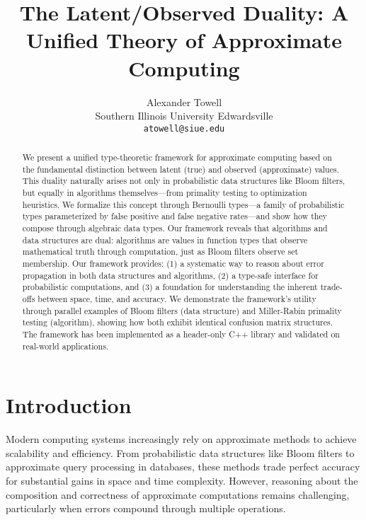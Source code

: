 \documentclass[11pt]{article}
\title{The Latent/Observed Duality: A Unified Theory of Approximate Computing}
\author{Alexander Towell\\
Southern Illinois University Edwardsville\\
\texttt{atowell@siue.edu}}
\begin{document}
\maketitle

\begin{abstract}
We present a unified type-theoretic framework for approximate computing based on the fundamental distinction between latent (true) and observed (approximate) values. This duality naturally arises not only in probabilistic data structures like Bloom filters, but equally in algorithms themselves—from primality testing to optimization heuristics. We formalize this concept through Bernoulli types—a family of probabilistic types parameterized by false positive and false negative rates—and show how they compose through algebraic data types. Our framework reveals that algorithms and data structures are dual: algorithms are values in function types that observe mathematical truth through computation, just as Bloom filters observe set membership. Our framework provides: (1) a systematic way to reason about error propagation in both data structures and algorithms, (2) a type-safe interface for probabilistic computations, and (3) a foundation for understanding the inherent trade-offs between space, time, and accuracy. We demonstrate the framework's utility through parallel examples of Bloom filters (data structure) and Miller-Rabin primality testing (algorithm), showing how both exhibit identical confusion matrix structures. The framework has been implemented as a header-only C++ library and validated on real-world applications.
\end{abstract}


\maketitle

\section{Introduction}

Modern computing systems increasingly rely on approximate methods to achieve scalability and efficiency. From probabilistic data structures like Bloom filters to approximate query processing in databases, these methods trade perfect accuracy for substantial gains in space and time complexity. However, reasoning about the composition and correctness of approximate computations remains challenging, particularly when errors compound through multiple operations.
\end{document}
